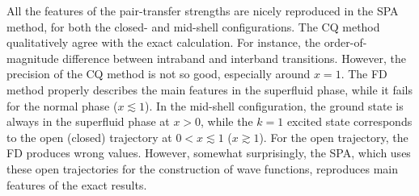 \documentclass[%
superscriptaddress,
preprint,
showpacs,
nofootinbib,
amsmath,amssymb,
aps,
prc,
floatfix ]%
{revtex4-1}
\begin{document}
All the features of the pair-transfer strengths
are nicely reproduced in the SPA method,
for both the closed- and mid-shell configurations.
The CQ method qualitatively agree with the exact calculation.
For instance, the order-of-magnitude difference between intraband
and interband transitions.
However, the precision of the CQ method is not so good,
especially around $x=1$.
The FD method properly describes the main features
in the superfluid phase, while it fails for the normal phase
($x\lesssim 1$). 
In the mid-shell configuration, the ground state is always
in the superfluid phase at $x>0$,
while the $k=1$ excited state corresponds to
the open (closed) trajectory at $0<x\lesssim 1$ ($x\gtrsim 1$).
For the open trajectory, the FD produces wrong values.
However, somewhat surprisingly,
the SPA, which uses these open trajectories for the construction
of wave functions,
reproduces main features of the exact results.

\end{document}
